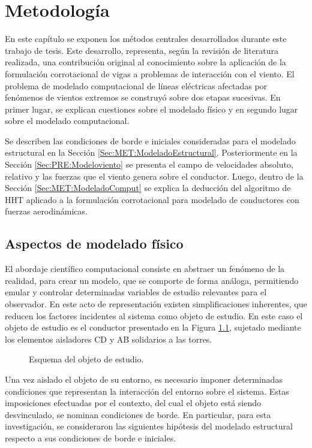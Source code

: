 \chapter{Metodología}\label{Cap:Metodologia}


En este capítulo se exponen los métodos centrales desarrollados durante este trabajo de tesis. Este desarrollo, representa, según la revisión de literatura realizada, una contribución original al conocimiento sobre la aplicación de la formulación corrotacional de vigas a problemas de interacción con el viento. El problema de modelado computacional de líneas eléctricas afectadas por fenómenos de vientos extremos se construyó sobre dos etapas sucesivas. En primer lugar, se explican cuestiones sobre el modelado físico y en segundo lugar sobre el modelado computacional.

Se describen las condiciones de borde e iniciales consideradas para el modelado estructural en la Sección \ref{Sec:MET:ModeladoEstructural}. Posteriormente en la Sección \ref{Sec:PRE:Modeloviento} se presenta el campo de velocidades absoluto, relativo y las fuerzas que el viento genera sobre el conductor. Luego, dentro de la Sección \ref{Sec:MET:ModeladoComput} se explica la deducción del algoritmo de HHT aplicado a la formulación corrotacional para modelado de conductores con fuerzas aerodinámicas.

\section{Aspectos de modelado físico}

El abordaje científico computacional consiste en abstraer un fenómeno de la realidad, para crear un modelo, que se comporte de forma análoga, permitiendo emular y controlar determinadas variables de estudio relevantes para el observador. En este acto de representación existen simplificaciones inherentes, que reducen los factores incidentes al sistema como objeto de estudio. En este caso el objeto de estudio es el conductor presentado en la Figura \ref{fig:MET:EsquemaCondiciones}, sujetado mediante los elementos aisladores CD y AB solidarios a las torres.

\begin{figure}[htbp]
	\centering
	\def\svgwidth{80mm}
	
	\caption{Esquema del objeto de estudio.}
	\label{fig:MET:EsquemaCondiciones}
\end{figure}

Una vez aislado el objeto de su entorno, es necesario imponer determinadas condiciones que representan la interacción del entorno sobre el sistema. Estas imposiciones efectuadas por el contexto, del cual el objeto está siendo desvinculado, se nominan condiciones de borde. En particular, para esta investigación, se consideraron las siguientes hipótesis del modelado estructural respecto a sus condiciones de borde e iniciales.



